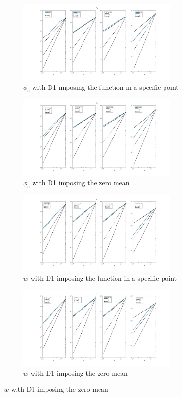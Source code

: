\documentclass[a4paper,11pt]{article}
\begin{document}
\begin{figure}[h]
\begin{subfigure}{0.5\textwidth}
\includegraphics[width = 8cm]{./D1_Phie_1.jpg}
\caption*{$\phi_e$ with D1 imposing the function in a specific point}
\label{Phie_1}
\end{subfigure}
\begin{subfigure}{0.5\textwidth}
\includegraphics[width =8cm]{./D1_Phie_2.jpg}
\caption*{$\phi_e$ with D1 imposing the zero mean}
\label{Phie_2}
\end{subfigure}
\begin{subfigure}{0.5\textwidth}
\includegraphics[width = 8cm]{./D1_w_1.jpg}
\caption*{$w$ with D1 imposing the function in a specific point}
\label{w_1}
\end{subfigure}
\begin{subfigure}{0.5\textwidth}
\includegraphics[width =8cm]{./D1_w_2.jpg}
\caption*{$w$ with D1 imposing the zero mean}
\label{w_2}
\end{subfigure}
\end{figure}
    \newpage ~\newpage
    \printbibliography
\end{document}
